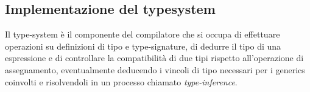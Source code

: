 \subsection{Implementazione del typesystem}
Il type-system è il componente del compilatore che si occupa di effettuare operazioni su definizioni di tipo e 
type-signature, di dedurre il tipo di una espressione e di controllare la compatibilità di due tipi rispetto 
all'operazione di assegnamento, eventualmente deducendo i vincoli di tipo necessari per i generics coinvolti e risolvendoli
in un processo chiamato \textit{type-inference}.






\newpage